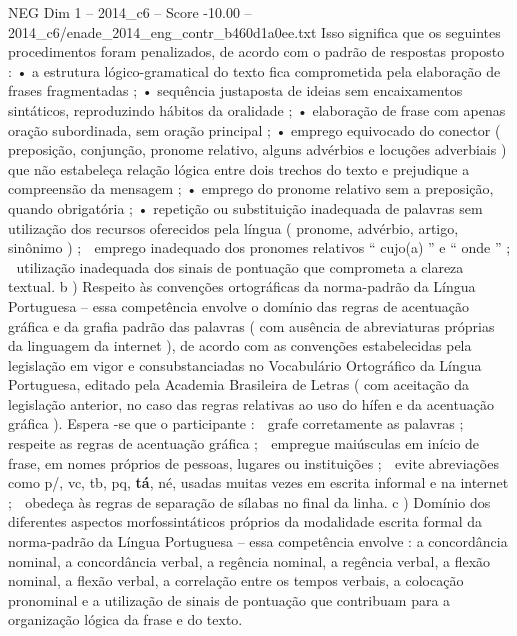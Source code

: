 \begin{textsample}{NEG Dim 1 – 2014\_c6 – Score -10.00 – 2014\_c6/enade\_2014\_eng\_contr\_b460d1a0ee.txt}
Isso significa que os seguintes procedimentos foram penalizados, de acordo com o padrão de respostas proposto : • a estrutura lógico-gramatical do texto fica comprometida pela elaboração de frases fragmentadas ; • sequência justaposta de ideias sem encaixamentos sintáticos, reproduzindo hábitos da oralidade ; • elaboração de frase com apenas oração subordinada, sem oração principal ; • emprego equivocado do conector ( preposição, conjunção, pronome relativo, alguns advérbios e locuções adverbiais ) que não estabeleça relação lógica entre dois trechos do texto e prejudique a compreensão da mensagem ; • emprego do pronome relativo sem a preposição, quando obrigatória ; • repetição ou substituição inadequada de palavras sem utilização dos recursos oferecidos pela língua ( pronome, advérbio, artigo, sinônimo ) ;  emprego inadequado dos pronomes relativos “ cujo(a) ” e “ onde ” ;  utilização inadequada dos sinais de pontuação que comprometa a clareza textual. b ) Respeito às convenções ortográficas da norma-padrão da Língua Portuguesa – essa competência envolve o domínio das regras de acentuação gráfica e da grafia padrão das palavras ( com ausência de abreviaturas próprias da linguagem da internet ), de acordo com as convenções estabelecidas pela legislação em vigor e consubstanciadas no Vocabulário Ortográfico da Língua Portuguesa, editado pela Academia Brasileira de Letras ( com aceitação da legislação anterior, no caso das regras relativas ao uso do hífen e da acentuação gráfica ).
Espera -se que o participante :  grafe corretamente as palavras ;  respeite as regras de acentuação gráfica ;  empregue maiúsculas em início de frase, em nomes próprios de pessoas, lugares ou instituições ;  evite abreviações como p/, vc, tb, pq, \textbf{tá}, né, usadas muitas vezes em escrita informal e na internet ;  obedeça às regras de separação de sílabas no final da linha. c ) Domínio dos diferentes aspectos morfossintáticos próprios da modalidade escrita formal da norma-padrão da Língua Portuguesa – essa competência envolve : a concordância nominal, a concordância verbal, a regência nominal, a regência verbal, a flexão nominal, a flexão verbal, a correlação entre os tempos verbais, a colocação pronominal e a utilização de sinais de pontuação que contribuam para a organização lógica da frase e do texto.

\end{textsample}
